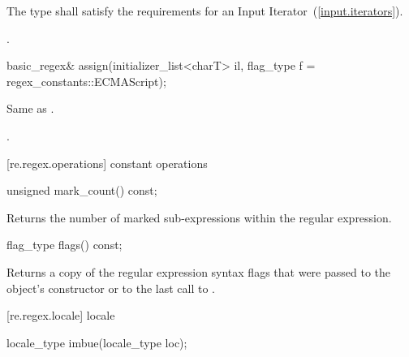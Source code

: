 \begin{itemdescr}
\pnum
\requires  The type  shall satisfy the requirements for an Input
Iterator~(\ref{input.iterators}).

\pnum
\returns  {}.
\end{itemdescr}

%
%
\begin{itemdecl}
basic_regex& assign(initializer_list<charT> il,
                    flag_type f = regex_constants::ECMAScript);
\end{itemdecl}

\begin{itemdescr}
\pnum
\effects Same as .

\pnum
\returns {}.
\end{itemdescr}


[re.regex.operations]{ constant operations}

%
%
\begin{itemdecl}
unsigned mark_count() const; 
\end{itemdecl}

\begin{itemdescr}
\pnum
\effects  Returns the number of marked sub-expressions within the
regular expression.
\end{itemdescr}

%
%
\begin{itemdecl}
flag_type flags() const; 
\end{itemdecl}

\begin{itemdescr}
\pnum
\effects  Returns a copy of the regular expression syntax flags that
were passed to the object's constructor or to the last call
to .
\end{itemdescr}

[re.regex.locale]{ locale}%

%
%
\begin{itemdecl}
locale_type imbue(locale_type loc);
\end{itemdecl}

